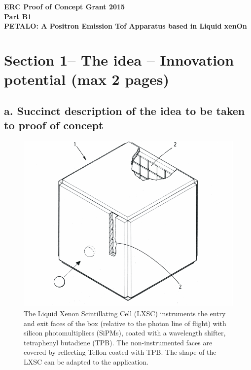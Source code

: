 \documentclass[11pt,a4paper]{article}
\begin{document}
%

\begin{center}
{\Large \bf \textsf{ERC Proof of Concept Grant 2015}} \\ \vspace{0.3cm}
{\Large \bf \textsf{Part B1}} \\ \vspace{0.3cm}
{\LARGE \bf \textsf{PETALO: A Positron Emission Tof Apparatus based in Liquid xenOn}}\\ \vspace{0.3cm}
\end{center}

\newpage

\section*{\bf \textsf{Section 1-- The idea -- Innovation potential (max 2 pages)}}
\subsection*{a. Succinct description of the idea to be taken to proof of concept}

%

\begin{figure}[!htbp]
	\centering
	\includegraphics[scale=0.6]{img/LXSC2.pdf}
	\caption{\label{fig.box} The Liquid Xenon Scintillating Cell (LXSC) instruments the entry and exit faces of the box (relative to the photon line of flight) with silicon photomultipliers (SiPMs), coated with a wavelength shifter, tetraphenyl butadiene (TPB). The non-instrumented faces are covered by reflecting Teflon coated with TPB. The shape of the LXSC can be adapted to the application. }
\end{figure}
\end{document}
